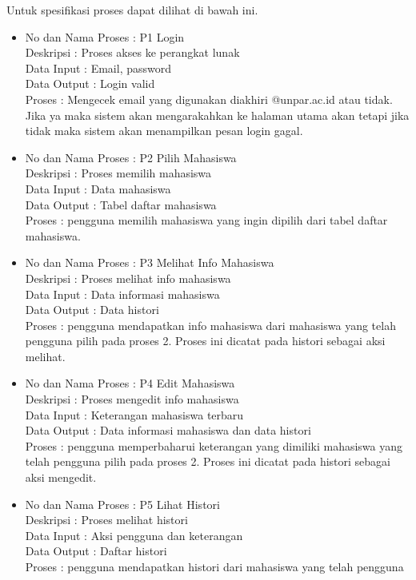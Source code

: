 \begin{enumerate}[(1)]
Untuk spesifikasi proses dapat dilihat di bawah ini.
\begin{itemize}
  \item No dan Nama Proses : P1 Login\\
  Deskripsi : Proses akses ke perangkat lunak\\
  Data Input : Email, password\\
  Data Output : Login valid\\
  Proses : Mengecek email yang digunakan diakhiri @unpar.ac.id atau tidak. Jika
  ya maka sistem akan mengarakahkan ke halaman utama akan tetapi jika tidak maka
  sistem akan menampilkan pesan login gagal.
  \item No dan Nama Proses : P2 Pilih Mahasiswa\\
  Deskripsi : Proses memilih mahasiswa\\
  Data Input : Data mahasiswa\\
  Data Output : Tabel daftar mahasiswa\\
  Proses : pengguna memilih mahasiswa yang ingin dipilih dari tabel daftar
  mahasiswa.
  \item No dan Nama Proses : P3 Melihat Info Mahasiswa\\
  Deskripsi : Proses melihat info mahasiswa\\
  Data Input : Data informasi mahasiswa\\
  Data Output : Data histori\\
  Proses : pengguna mendapatkan info mahasiswa dari mahasiswa yang telah
  pengguna pilih pada proses 2. Proses ini dicatat pada histori sebagai aksi
  melihat.
  \item No dan Nama Proses : P4 Edit Mahasiswa\\
  Deskripsi : Proses mengedit info mahasiswa\\
  Data Input : Keterangan mahasiswa terbaru\\
  Data Output : Data informasi mahasiswa dan data histori\\
  Proses : pengguna memperbaharui keterangan yang dimiliki mahasiswa yang telah
  pengguna pilih pada proses 2. Proses ini dicatat pada histori sebagai aksi
  mengedit.
  \item No dan Nama Proses : P5 Lihat Histori\\
  Deskripsi : Proses melihat histori\\
  Data Input : Aksi pengguna dan keterangan\\
  Data Output : Daftar histori\\
  Proses : pengguna mendapatkan histori dari mahasiswa yang telah pengguna

\end{itemize}
\end{enumerate}

